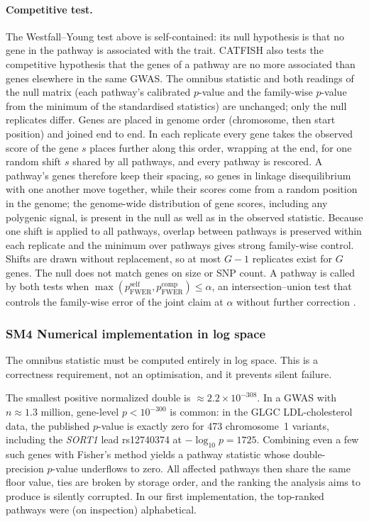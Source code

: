 \paragraph{Competitive test.}
The Westfall--Young test above is self-contained: its null hypothesis is that no
gene in the pathway is associated with the trait. CATFISH also tests the
competitive hypothesis that the genes of a pathway are no more associated than
genes elsewhere in the same GWAS. The omnibus statistic and both readings of the
null matrix (each pathway's calibrated $p$-value and the family-wise
$p$-value from the minimum of the standardised statistics) are unchanged; only
the null replicates differ. Genes are placed in genome order (chromosome, then
start position) and joined end to end. In each replicate every gene takes the
observed score of the gene $s$ places further along this order, wrapping at the
end, for one random shift $s$ shared by all pathways, and every pathway is
rescored. A pathway's genes therefore keep their spacing, so genes in linkage
disequilibrium with one another move together, while their scores come from a
random position in the genome; the genome-wide distribution of gene scores,
including any polygenic signal, is present in the null as well as in the
observed statistic. Because one shift is applied to all pathways, overlap
between pathways is preserved within each replicate and the minimum over
pathways gives strong family-wise control. Shifts are drawn without replacement,
so at most $G-1$ replicates exist for $G$ genes. The null does not match genes
on size or SNP count. A pathway is called by both tests when
$\max(p_{\mathrm{FWER}}^{\mathrm{self}}, p_{\mathrm{FWER}}^{\mathrm{comp}})\le\alpha$,
an intersection--union test that controls the family-wise error of the joint
claim at $\alpha$ without further correction \citep{Berger1982}.

\subsubsection*{SM4 Numerical implementation in log space}

The omnibus statistic must be computed entirely in log space. This is a correctness requirement, not an optimisation, and it prevents silent failure.

The smallest positive normalized double is $\approx2.2\times10^{-308}$. In a GWAS with $n\approx1.3$ million, gene-level $p<10^{-300}$ is common: in the GLGC LDL-cholesterol data, the published $p$-value is exactly zero for 473 chromosome~1 variants, including the \textit{SORT1} lead rs12740374 at $-\log_{10}p=1725$. Combining even a few such genes with Fisher’s method yields a pathway statistic whose double-precision $p$-value underflows to zero. All affected pathways then share the same floor value, ties are broken by storage order, and the ranking the analysis aims to produce is silently corrupted. In our first implementation, the top-ranked pathways were (on inspection) alphabetical.

